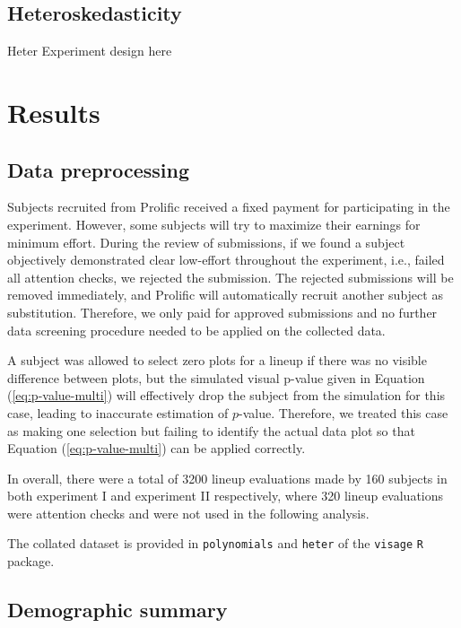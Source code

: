 \documentclass[]{interact}
\theoremstyle{plain}%
\theoremstyle{definition}
\theoremstyle{remark}
\begin{document}
\hypertarget{heteroskedasticity}{%
\subsection{Heteroskedasticity}\label{heteroskedasticity}}

Heter Experiment design here

\hypertarget{results}{%
\section{Results}\label{results}}

\hypertarget{data-preprocessing}{%
\subsection{Data preprocessing}\label{data-preprocessing}}

Subjects recruited from Prolific received a fixed payment for
participating in the experiment. However, some subjects will try to
maximize their earnings for minimum effort. During the review of
submissions, if we found a subject objectively demonstrated clear
low-effort throughout the experiment, i.e., failed all attention checks,
we rejected the submission. The rejected submissions will be removed
immediately, and Prolific will automatically recruit another subject as
substitution. Therefore, we only paid for approved submissions and no
further data screening procedure needed to be applied on the collected
data.

A subject was allowed to select zero plots for a lineup if there was no
visible difference between plots, but the simulated visual p-value given
in Equation (\ref{eq:p-value-multi}) will effectively drop the subject
from the simulation for this case, leading to inaccurate estimation of
\(p\)-value. Therefore, we treated this case as making one selection but
failing to identify the actual data plot so that Equation
(\ref{eq:p-value-multi}) can be applied correctly.

In overall, there were a total of 3200 lineup evaluations made by 160
subjects in both experiment I and experiment II respectively, where 320
lineup evaluations were attention checks and were not used in the
following analysis.

The collated dataset is provided in \texttt{polynomials} and
\texttt{heter} of the \texttt{visage} \texttt{R} package.

\hypertarget{demographic-summary}{%
\subsection{Demographic summary}\label{demographic-summary}}
\end{document}
